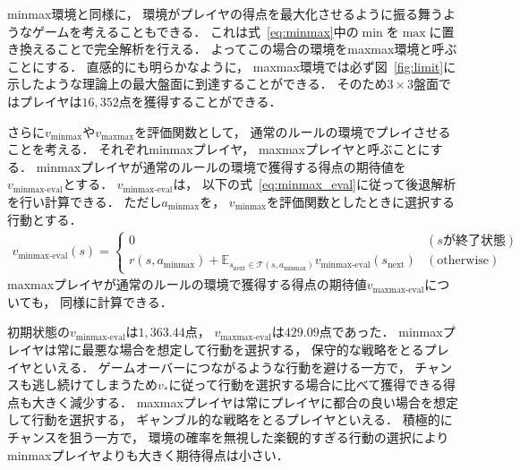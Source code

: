 minmax環境と同様に， 環境がプレイヤの得点を最大化させるように振る舞うようなゲームを考えることもできる．
これは式~\ref{eq:minmax}中の$\min$を$\max$に置き換えることで完全解析を行える．
よってこの場合の環境をmaxmax環境と呼ぶことにする．
直感的にも明らかなように， maxmax環境では必ず図~\ref{fig:limit}に示したような理論上の最大盤面に到達することができる．
そのため$3\times3$盤面ではプレイヤは$16,352$点を獲得することができる．

さらに$v_{\text{minmax}}$や$v_{\text{maxmax}}$を評価関数として， 通常のルールの環境でプレイさせることを考える．
それぞれminmaxプレイヤ， maxmaxプレイヤと呼ぶことにする．
minmaxプレイヤが通常のルールの環境で獲得する得点の期待値を$v_{\text{minmax-eval}}$とする．
$v_{\text{minmax-eval}}$は， 以下の式~\ref{eq:minmax_eval}に従って後退解析を行い計算できる．
ただし$a_{\text{minmax}}$を， $v_{\text{minmax}}$を評価関数としたときに選択する行動とする．
\begin{align}
    v_{\text{minmax-eval}}(s) =
    \begin{cases}
        0 & (s \text{が終了状態}) \\
        r(s, a_{\text{minmax}}) + \mathbb{E}_{s_\text{next} \in \mathcal{T}(s, a_{\text{minmax}})} v_{\text{minmax-eval}}(s_\text{next}) & (\text{otherwise})
    \end{cases}
    \label{eq:minmax_eval}
\end{align}
maxmaxプレイヤが通常のルールの環境で獲得する得点の期待値$v_{\text{maxmax-eval}}$についても， 同様に計算できる．

初期状態の$v_{\text{minmax-eval}}$は$1,363.44$点， $v_{\text{maxmax-eval}}$は$429.09$点であった．
minmaxプレイヤは常に最悪な場合を想定して行動を選択する， 保守的な戦略をとるプレイヤといえる．
ゲームオーバーにつながるような行動を避ける一方で， チャンスも逃し続けてしまうため$v_*$に従って行動を選択する場合に比べて獲得できる得点も大きく減少する．
maxmaxプレイヤは常にプレイヤに都合の良い場合を想定して行動を選択する， ギャンブル的な戦略をとるプレイヤといえる．
積極的にチャンスを狙う一方で， 環境の確率を無視した楽観的すぎる行動の選択によりminmaxプレイヤよりも大きく期待得点は小さい．